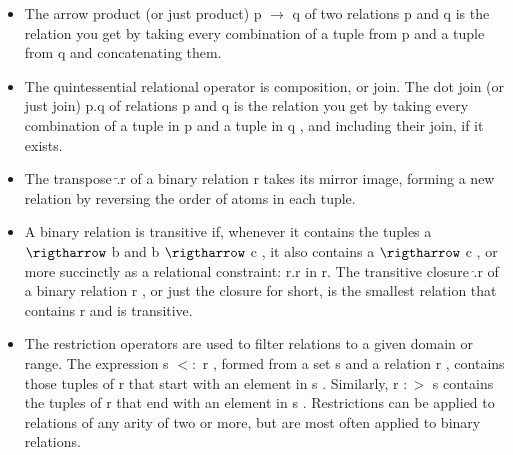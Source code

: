 \documentclass[11pt]{article}
\begin{document}
\begin{enumerate}
\begin{minipage}{\minpagw}
{{\begin{itemize}
    \item The arrow product (or just product) p $\rightarrow$ q of two relations p and q is the relation you get by taking every combination of a tuple from p and a tuple from q and concatenating them.
    \item The quintessential relational operator is composition, or join. The dot join (or just join) p.q of relations p and q is the relation you get by taking every combination of a tuple in p and a tuple in q , and including their join, if it exists.
    \item The transpose $\tilde{.}$r of a binary relation r takes its mirror image, forming a new relation by reversing the order of atoms in each tuple.
    \item A binary relation is transitive if, whenever it contains the tuples a $\rigtharrow$ b and b $\rigtharrow$ c , it also contains a $\rigtharrow$ c , or more succinctly as a relational constraint: r$.$r in r. The transitive closure $\hat{.}$r of a binary relation r , or just the closure for short, is the smallest relation that contains r and is transitive.
    \item The restriction operators are used to filter relations to a given domain or range. The expression s $<:$ r , formed from a set s and a relation r , contains those tuples of r that start with an element in s . Similarly, r $:>$ s contains the tuples of r that end with an element in s . Restrictions can be applied to relations of any arity of two or more, but are most often applied to binary relations.
\end{itemize} 
    }%
  }%
\end{minipage} 
\newpage
\begin{minipage}{\minpagw}
  \fbox{%
    \parbox{\linewidth}{%
    \begin{itemize}
    

\end{itemize}}}
\end{minipage}
\end{enumerate}
\end{document}
